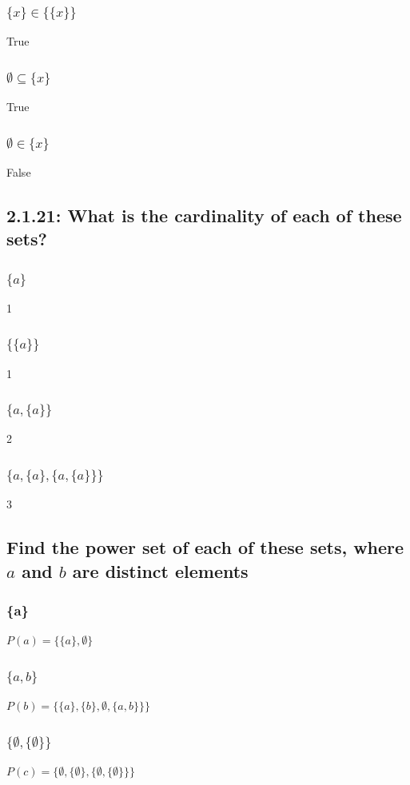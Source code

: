 \documentclass[12pt, a4paper]{report}
\begin{document}
					\subsubsection{$\{x\}\in\{\{x\}\}$}
						True
					\subsubsection{$\emptyset \subseteq \{x\}$}
						True
					\subsubsection{$\emptyset \in \{x\}$}
						False
				\setcounter{subsection}{20}
				\subsection{2.1.21: What is the cardinality of each of these sets?}
					\subsubsection{$\{a\}$}
						1
					\subsubsection{$\{\{a\}\}$}
						1
					\subsubsection{$\{a,\{a\}\}$}
						2
					\subsubsection{$\{a,\{a\},\{a,\{a\}\}\}$}
						3
				\setcounter{subsection}{22}
				\subsection{Find the power set of each of these sets, where $a$ and $b$ are distinct elements}
					\subsubsection{\{a\}}
						$P(a)=\{\{a\},\emptyset\}$
					\subsubsection{$\{a,b\}$}
						$P(b)=\{\{a\},\{b\},\emptyset, \{a,b\}\}\}$
					\subsubsection{$\{\emptyset,\{\emptyset\}\}$}
						$P(c)=\{\emptyset, \{\emptyset\},\{\emptyset,\{\emptyset\}\}\}$
\end{document}
